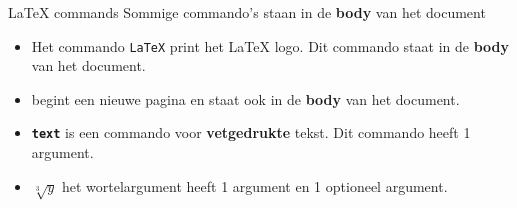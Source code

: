 \copyrightTim

\begin{frame}[fragile]{LaTeX commands}
    Sommige commando's staan in de \textbf{body} van het document
    \newline
    \begin{itemize}
    \item Het commando \texttt{\LaTeX} print het \LaTeX{} logo. Dit commando staat in de \textbf{body} van het document. \newline

    \item \texttt{\newpage} begint een nieuwe pagina en staat ook in de \textbf{body} van het document.
    \newline

    \item \texttt{\textbf{text}} is een commando voor \textbf{vetgedrukte} tekst. Dit commando heeft 1 argument.
    \newline
    \item \texttt{}  \(\sqrt[3]{y}\) het wortelargument heeft 1 argument en 1 optioneel argument.
    \end{itemize}
\end{frame}